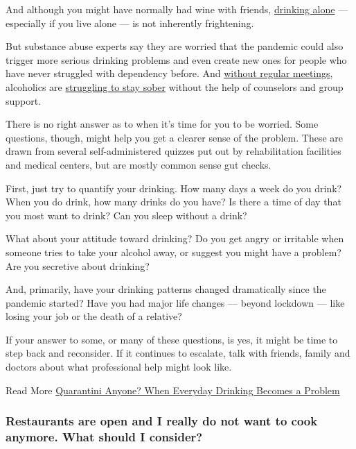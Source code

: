And although you might have normally had wine with friends,
\href{https://www.nytimes.com/2020/03/16/dining/drinks/drinking-alone.html}{drinking
alone} --- especially if you live alone --- is not inherently
frightening.

But substance abuse experts say they are worried that the pandemic could
also trigger more serious drinking problems and even create new ones for
people who have never struggled with dependency before. And
\href{https://www.nytimes.com/2020/04/02/nyregion/coronavirus-alcoholics-anonymous-online.html}{without
regular meetings}, alcoholics are
\href{https://www.nytimes.com/2020/03/26/health/coronavirus-alcoholics-drugs-online.html}{struggling
to stay sober} without the help of counselors and group support.

There is no right answer as to when it's time for you to be worried.
Some questions, though, might help you get a clearer sense of the
problem. These are drawn from several self-administered quizzes put out
by rehabilitation facilities and medical centers, but are mostly common
sense gut checks.

First, just try to quantify your drinking. How many days a week do you
drink? When you do drink, how many drinks do you have? Is there a time
of day that you most want to drink? Can you sleep without a drink?

What about your attitude toward drinking? Do you get angry or irritable
when someone tries to take your alcohol away, or suggest you might have
a problem? Are you secretive about drinking?

And, primarily, have your drinking patterns changed dramatically since
the pandemic started? Have you had major life changes --- beyond
lockdown --- like losing your job or the death of a relative?

If your answer to some, or many of these questions, is yes, it might be
time to step back and reconsider. If it continues to escalate, talk with
friends, family and doctors about what professional help might look
like.

 Read More
\href{https://www.nytimes.com/2020/04/30/us/30IHW-drinking-women-coronavirus-quarantine-habit.html}{Quarantini
Anyone? When Everyday Drinking Becomes a Problem}

\hypertarget{restaurants-are-open-and-i-really-do-not-want-to-cook-anymore-what-should-i-consider}{%
\subsubsection{Restaurants are open and I really do not want to cook
anymore. What should I
consider?}\label{restaurants-are-open-and-i-really-do-not-want-to-cook-anymore-what-should-i-consider}}


